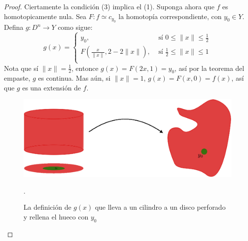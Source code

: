 \begin{proof}
    Ciertamente la condici\'on (3) implica el (1). Suponga ahora que $f$ es
    homotopicamente nula. Sea  $F:f \simeq c_{y_0}$ la homotop\'ia
    correspondiente, con $y_0 \in Y$. Defina $g:D^{n} \xrightarrow{} Y$ como
    sigue:
    \begin{equation*}
     g(x)=\begin{cases}
            y_0,    &   \text{ s\'i } 0 \leq \|x\| \leq \frac{1}{2} \\
            F(\frac{x}{\|x\|},2-2\|x\|), & \text{ s\'i } \frac{1}{2} \leq \|x\| \leq 1 \\
        \end{cases}
    \end{equation*}
    Nota que s\'i $\|x\|=\frac{1}{2}$, entonce $g(x)=F(2x,1)=y_0$, as\'i por la
    teorema del empaste, $g$ es continua. Mas a\'un, si  $\|x\|=1$,
    $g(x)=F(x,0)=f(x)$, as\'i que $g$ es una extensi\'on de  $f$.

    \begin{figure}[h]
        \centering
        \includegraphics[scale=0.5]{Figures/equiv_homotopy.eps}
        \caption{La definici\'on de $g(x)$ que lleva a un cilindro a un disco
        perforado y rellena el hueco con $y_0$}.
        \label{fig_12}
    \end{figure}
\end{proof}
